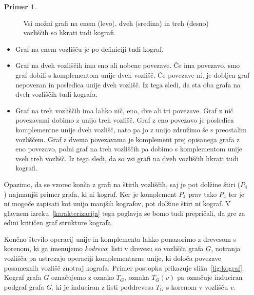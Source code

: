 \documentclass[12pt,a4paper,twoside]{article}
\theoremstyle{definition} %
\newtheorem{primer}[definicija]{Primer}
\theoremstyle{plain} %
\numberwithin{equation}{section}  %
\begin{document}
\begin{primer}
\begin{figure}[h!]
\begin{tikzpicture}[main_node/.style={circle,minimum size = 0.7cm,draw,inner sep=5pt, scale=0.5}]
\end{tikzpicture}
\caption{Vsi možni grafi na enem (levo), dveh (sredina) in treh (desno) vozliščih so hkrati tudi kografi.} \label{primerMajhnihKografov}
\end{figure}
\begin{itemize}
\item Graf na enem vozlišču je po definiciji tudi kograf.
\item Graf na dveh vozliščih ima eno ali nobene povezave. Če ima povezavo, smo graf dobili s komplementom unije dveh vozlišč. Če povezave ni, je dobljen graf nepovezan in posledica unije dveh vozlišč. Iz tega sledi, da sta oba grafa na dveh vozliščih tudi kografa.
\item Graf na treh vozliščih ima lahko nič, eno, dve ali tri povezave. Graf z nič povezavami dobimo z unijo treh vozlišč. Graf z eno povezavo je posledica komplementne unije dveh vozlišč, nato pa jo z unijo združimo še s preostalim vozliščem. Graf z dvema povezavama je komplement prej opisanega grafa z eno povezavo, polni graf na treh vozliščih pa dobimo s komplementom unije vseh treh vozlišč. Iz tega sledi, da so vsi grafi na dveh vozliščih hkrati tudi kografi.
\end{itemize}
Opazimo, da se vzorec konča z grafi na štirih vozliščih, saj je pot dolžine štiri ($P_4$) najmanjši primer grafa, ki ni kograf. Ker je komplement $P_4$ prav tako $P_4$ ter je ni mogoče zapisati kot unijo manjših kografov, pot dolžine štiri ni kograf. V glavnem izreku~\ref{karakterizacija} tega poglavja se bomo tudi prepričali, da gre za edini kritičen graf strukture kografa.
\end{primer}

Končno število operacij unije in komplementa lahko ponazorimo z drevesom s korenom, ki ga imenujemo \emph{kodrevo}; listi v drevesu so vozlišča grafa $G$, notranja vozlišča pa ustrezajo operaciji komplementarne unije, ki določa povezave posameznih vozlišč znotraj kografa. Primer postopka prikazuje slika~\ref{fig:kograf}. Kograf grafa $G$ označujemo z oznako $T_G$, oznaka $T_G(v)$ pa označuje induciran podgraf grafa $G$, ki je induciran z listi poddrevesa $T_G$ s korenom v vozlišču $v$.
\end{document}
